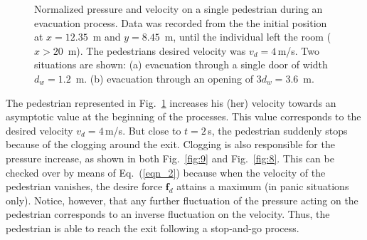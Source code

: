 \begin{figure}[!htbp]
\hfill
{}
\caption{\label{fig:8and9} Normalized pressure and velocity on a single 
pedestrian during an evacuation process. Data was recorded from the 
the initial position at $x=12.35$~m and $y=8.45$~m, until the individual left 
the room ($x>20$~m).  The pedestrians desired velocity was $v_d=4\,$m/s. Two 
situations are shown: (a) evacuation through a single door of width 
$d_w=1.2$~m. (b) evacuation through an opening of $3d_w=3.6$~m.} 
\end{figure}


The pedestrian represented in Fig.~\ref{fig:8and9} increases his (her) 
velocity towards an asymptotic value at the beginning of the processes. This 
value corresponds to the desired velocity $v_d=4\,$m/s. But close to $t=2\,$s, 
the pedestrian suddenly stops because of the clogging around the exit. Clogging 
is also responsible for the pressure increase, as shown in both Fig.~\ref{fig:9} 
and Fig.~\ref{fig:8}. This can be checked over by means of Eq.~(\ref{eqn_2}) 
because when the velocity of the pedestrian vanishes, the desire force 
$\mathbf{f}_d$ attains a maximum (in panic situations only). Notice, however, 
that any further fluctuation of the pressure acting on the pedestrian 
corresponds to an inverse fluctuation on the velocity. Thus, the pedestrian is 
able to reach the exit following a stop-and-go 
process. \\

